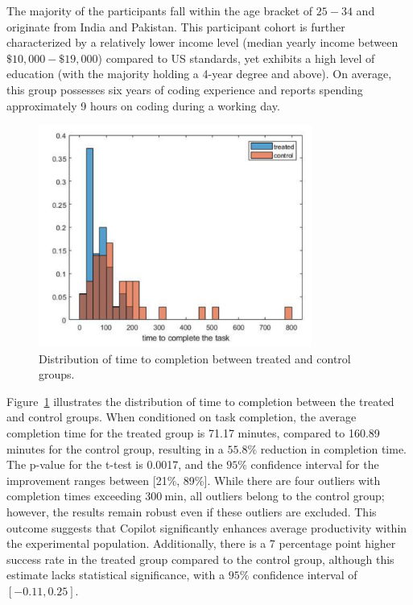 \documentclass[12pt]{extarticle}
\begin{document}
The majority of the participants fall within the age bracket of $25-34$ and originate from India and Pakistan. This participant cohort is further characterized by a relatively lower income level (median yearly income between $\$10,000-\$19,000$) compared to US standards, yet exhibits a high level of education (with the majority holding a 4-year degree and above). On average, this group possesses six years of coding experience and reports spending approximately 9 hours on coding during a working day.

\begin{figure}[ht]
    \centering
    \includegraphics[width=0.8\textwidth]{img/task_completion_time.png}
    \caption{Distribution of time to completion between treated and control groups.}\label{fig:task_completion_time}
\end{figure}

Figure~\ref{fig:task_completion_time} illustrates the distribution of time to completion between the treated and control groups. When conditioned on task completion, the average completion time for the treated group is 71.17 minutes, compared to 160.89 minutes for the control group, resulting in a $55.8\%$ reduction in completion time. The p-value for the t-test is 0.0017, and the $95\%$ confidence interval for the improvement ranges between [21\%, 89\%]. While there are four outliers with completion times exceeding $300 \mathrm{~min}$, all outliers belong to the control group; however, the results remain robust even if these outliers are excluded. This outcome suggests that Copilot significantly enhances average productivity within the experimental population. Additionally, there is a 7 percentage point higher success rate in the treated group compared to the control group, although this estimate lacks statistical significance, with a $95\%$ confidence interval of $[-0.11, 0.25]$.
\end{document}
